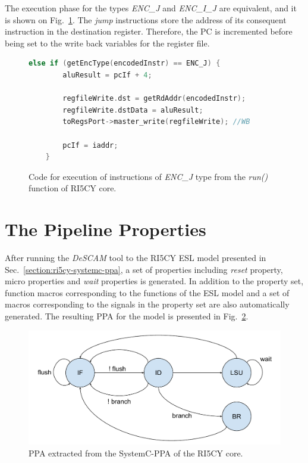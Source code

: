 The execution phase for the types \textit{ENC\_J} and \textit{ENC\_I\_J} are equivalent, and it is shown on Fig.~\ref{fig:ri5cy-enc-j}. The \textit{jump} instructions store the address of its consequent instruction in the destination register. Therefore, the PC is incremented before being set to the write back variables for the register file.

\begin{figure}[htb!]
    \begin{lstlisting}[language=c++]
    else if (getEncType(encodedInstr) == ENC_J) {
        aluResult = pcIf + 4;
        
        regfileWrite.dst = getRdAddr(encodedInstr);
        regfileWrite.dstData = aluResult;
        toRegsPort->master_write(regfileWrite); //WB
        
        pcIf = iaddr;
    }\end{lstlisting}
    \caption{Code for execution of instructions of \textit{ENC\_J} type from the \textit{run()} function of RI5CY core.}
    \label{fig:ri5cy-enc-j}
\end{figure}

\section{The Pipeline Properties}
\label{section:ri5cy_pipe_ppt}

After running the \textit{DeSCAM} tool to the RI5CY ESL model presented in Sec.~\ref{section:ri5cy-systemc-ppa}, a set of properties including \textit{reset} property, micro properties and \textit{wait} properties is generated. In addition to the property set, function macros corresponding to the functions of the ESL model and a set of macros corresponding to the signals in the property set are also automatically generated. The resulting PPA for the model is presented in Fig.~\ref{fig:ri5cy-ppa}.

\begin{figure}[htb!]
	\centering
	\includegraphics[width=\textwidth]{images/ri5cy-ppa.pdf}
	\caption{PPA extracted from the SystemC-PPA of the RI5CY core.}
	\label{fig:ri5cy-ppa}
\end{figure}

